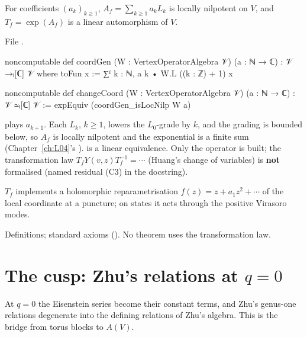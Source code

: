 \begin{definition}\label{l14:def:changeCoord}
For coefficients $(a_k)_{k\ge1}$, $A_f = \sum_{k\ge1}a_kL_k$ is locally nilpotent on $V$, and $T_f = \exp(A_f)$ is a linear
automorphism of $V$.
\end{definition}
\noindent File .
\begin{leancode}
noncomputable def coordGen (W : VertexOperatorAlgebra 𝒱) (a : ℕ → ℂ) : 𝒱 →ₗ[ℂ] 𝒱 where
  toFun x := ∑ᶠ k : ℕ, a k • W.L ((k : ℤ) + 1) x

noncomputable def changeCoord (W : VertexOperatorAlgebra 𝒱) (a : ℕ → ℂ) : 𝒱 ≃ₗ[ℂ] 𝒱 :=
  expEquiv (coordGen_isLocNilp W a)
\end{leancode}
\begin{dictionary}
 plays $a_{k+1}$. Each $L_k$, $k\ge1$, lowers the $L_0$-grade by $k$, and the grading is bounded below, so $A_f$ is
locally nilpotent and the exponential is a finite sum (Chapter~\ref{ch:L04}'s ).  is a linear
equivalence. Only the operator is built; the transformation law $T_fY(v,z)T_f^{-1} = \cdots$ (Huang's change of variables) is
\textbf{not} formalised (named residual (C3) in the docstring).
\end{dictionary}
\begin{physics}
$T_f$ implements a holomorphic reparametrisation $f(z) = z + a_1z^2+\cdots$ of the local coordinate at a puncture; on states
it acts through the positive Virasoro modes.
\end{physics}
\begin{status}
Definitions; standard axioms (). No theorem uses the transformation law.
\end{status}

\section{The cusp: Zhu's relations at \texorpdfstring{$q=0$}{q=0}}\label{l14:sec:cusp}

At $q=0$ the Eisenstein series become their constant terms, and Zhu's genus-one relations degenerate into the defining relations
of Zhu's algebra. This is the bridge from torus blocks to $A(V)$.

